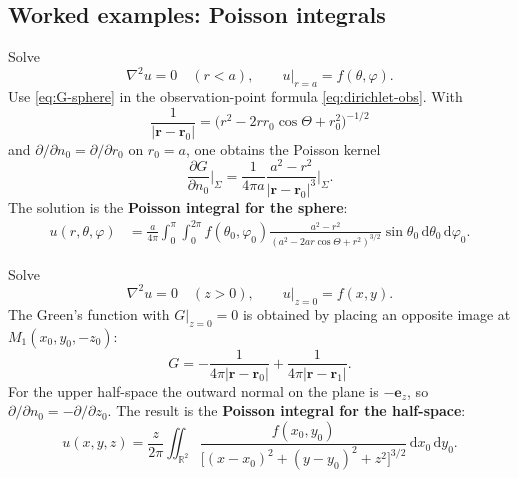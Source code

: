 \subsection{Worked examples: Poisson integrals}

\begin{example}
Solve
\begin{equation}
\nabla^2 u=0\quad(r<a),\qquad u\big|_{r=a}=f(\theta,\varphi).
\end{equation}
Use \eqref{eq:G-sphere} in the observation-point formula \eqref{eq:dirichlet-obs}. With
\begin{equation}
\frac{1}{|\mathbf{r}-\mathbf{r}_0|}=\bigl(r^2-2rr_0\cos\Theta+r_0^2\bigr)^{-1/2}
\end{equation}
and $\partial/\partial n_0=\partial/\partial r_0$ on $r_0=a$, one obtains the Poisson kernel
\begin{equation}
\frac{\partial G}{\partial n_0}\Big|_{\Sigma}
=\frac{1}{4\pi a}\frac{a^2-r^2}{|\mathbf{r}-\mathbf{r}_0|^3}\Big|_{\Sigma}.
\end{equation}
The solution is the \textbf{Poisson integral for the sphere}:
\begin{equation}
\begin{aligned}
u(r,\theta,\varphi)
&=\frac{a}{4\pi}\int_0^\pi\int_0^{2\pi}
f(\theta_0,\varphi_0)
\frac{a^2-r^2}{(a^2-2ar\cos\Theta+r^2)^{3/2}}
\sin\theta_0\,\mathrm{d}\theta_0\,\mathrm{d}\varphi_0.
\end{aligned}
\end{equation}
\end{example}

\begin{example}
Solve
\begin{equation}
\nabla^2 u=0\quad(z>0),\qquad u\big|_{z=0}=f(x,y).
\end{equation}
The Green's function with $G|_{z=0}=0$ is obtained by placing an opposite image at $M_1(x_0,y_0,-z_0)$:
\begin{equation}
G=-\frac{1}{4\pi|\mathbf{r}-\mathbf{r}_0|}+\frac{1}{4\pi|\mathbf{r}-\mathbf{r}_1|}.
\end{equation}
For the upper half-space the outward normal on the plane is $-\mathbf{e}_z$, so $\partial/\partial n_0=-\partial/\partial z_0$. The result is the \textbf{Poisson integral for the half-space}:
\begin{equation}
u(x,y,z)
=\frac{z}{2\pi}\iint_{\mathbb{R}^2}
\frac{f(x_0,y_0)}{\bigl[(x-x_0)^2+(y-y_0)^2+z^2\bigr]^{3/2}}\,\mathrm{d}x_0\,\mathrm{d}y_0.
\end{equation}
\end{example}

